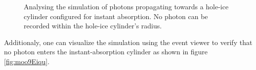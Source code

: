 \begin{figure}[htbp]
  \hfill
  \caption{Analysing the simulation of photons propagating towards a hole-ice cylinder configured for instant absorption. No photon can be recorded within the hole-ice cylinder's radius.}
  \label{fig:chiep7Is}
\end{figure}

Additionaly, one can visualize the simulation using the  event viewer to verify that no photon enters the instant-absorption cylinder as shown in figure \ref{fig:moo9Eiqu}.


